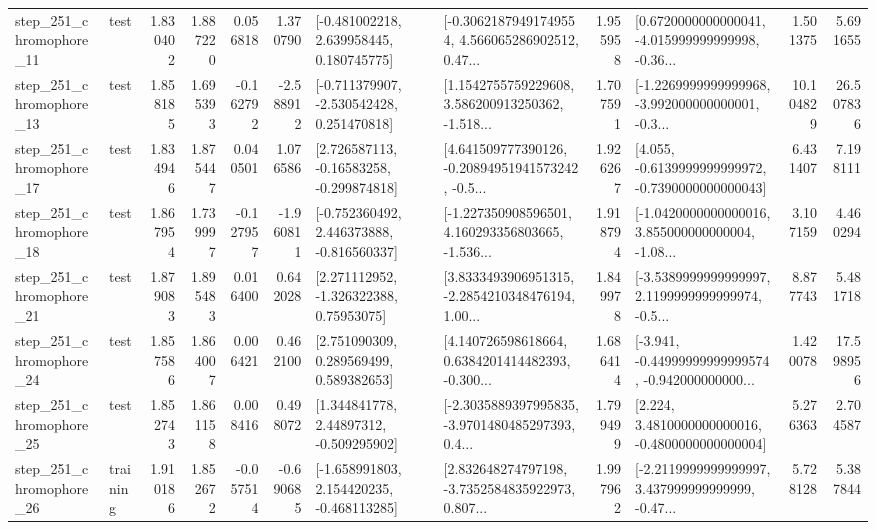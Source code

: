 \begin{tabular}{llrrrrllrlrr}
  step\_251\_chromophore\_11 &      test &      1.830402 &    1.887220 &      0.056818 &  1.370790 &    [-0.481002218, 2.639958445, 0.180745775] &  [-0.30621879491749554, 4.566065286902512, 0.47... &       1.955958 &  [0.6720000000000041, -4.015999999999998, -0.36... &            1.501375 &          5.691655 \\
  step\_251\_chromophore\_13 &      test &      1.858185 &    1.695393 &     -0.162792 & -2.588912 &   [-0.711379907, -2.530542428, 0.251470818] &  [1.1542755759229608, 3.586200913250362, -1.518... &       1.707591 &  [-1.2269999999999968, -3.992000000000001, -0.3... &           10.104829 &         26.507836 \\
  step\_251\_chromophore\_17 &      test &      1.834946 &    1.875447 &      0.040501 &  1.076586 &    [2.726587113, -0.16583258, -0.299874818] &  [4.641509777390126, -0.20894951941573242, -0.5... &       1.926267 &  [4.055, -0.6139999999999972, -0.7390000000000043] &            6.431407 &          7.198111 \\
  step\_251\_chromophore\_18 &      test &      1.867954 &    1.739997 &     -0.127957 & -1.960811 &   [-0.752360492, 2.446373888, -0.816560337] &  [-1.227350908596501, 4.160293356803665, -1.536... &       1.918794 &  [-1.0420000000000016, 3.855000000000004, -1.08... &            3.107159 &          4.460294 \\
  step\_251\_chromophore\_21 &      test &      1.879083 &    1.895483 &      0.016400 &  0.642028 &     [2.271112952, -1.326322388, 0.75953075] &  [3.8333493906951315, -2.2854210348476194, 1.00... &       1.849978 &  [-3.5389999999999997, 2.1199999999999974, -0.5... &            8.877743 &          5.481718 \\
  step\_251\_chromophore\_24 &      test &      1.857586 &    1.864007 &      0.006421 &  0.462100 &     [2.751090309, 0.289569499, 0.589382653] &  [4.140726598618664, 0.6384201414482393, -0.300... &       1.686414 &  [-3.941, -0.44999999999999574, -0.942000000000... &            1.420078 &         17.598956 \\
  step\_251\_chromophore\_25 &      test &      1.852743 &    1.861158 &      0.008416 &  0.498072 &     [1.344841778, 2.44897312, -0.509295902] &  [-2.3035889397995835, -3.9701480485297393, 0.4... &       1.799499 &   [2.224, 3.4810000000000016, -0.4800000000000004] &            5.276363 &          2.704587 \\
  step\_251\_chromophore\_26 &  training &      1.910186 &    1.852672 &     -0.057514 & -0.690685 &   [-1.658991803, 2.154420235, -0.468113285] &  [2.832648274797198, -3.7352584835922973, 0.807... &       1.997962 &  [-2.2119999999999997, 3.437999999999999, -0.47... &            5.728128 &          5.387844 \\

\end{tabular}
